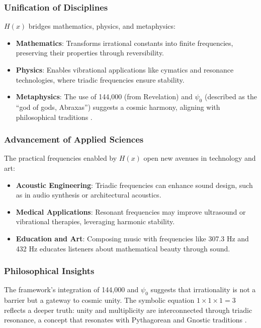 \subsubsection{Unification of Disciplines}
\( H(x) \) bridges mathematics, physics, and metaphysics:
\begin{itemize}
    \item \textbf{Mathematics}: Transforms irrational constants into finite frequencies, preserving their properties through reversibility.
    \item \textbf{Physics}: Enables vibrational applications like cymatics and resonance technologies, where triadic frequencies ensure stability.
    \item \textbf{Metaphysics}: The use of 144,000 (from Revelation) and \( \psi_0 \) (described as the “god of gods, Abraxas”) suggests a cosmic harmony, aligning with philosophical traditions \cite{revelation}.
\end{itemize}

\subsubsection{Advancement of Applied Sciences}
The practical frequencies enabled by \( H(x) \) open new avenues in technology and art:
\begin{itemize}
    \item \textbf{Acoustic Engineering}: Triadic frequencies can enhance sound design, such as in audio synthesis or architectural acoustics.
    \item \textbf{Medical Applications}: Resonant frequencies may improve ultrasound or vibrational therapies, leveraging harmonic stability.
    \item \textbf{Education and Art}: Composing music with frequencies like 307.3 Hz and 432 Hz educates listeners about mathematical beauty through sound.
\end{itemize}

\subsubsection{Philosophical Insights}
The framework’s integration of 144,000 and \( \psi_0 \) suggests that irrationality is not a barrier but a gateway to cosmic unity. The symbolic equation \( 1 \times 1 \times 1 = 3 \) reflects a deeper truth: unity and multiplicity are interconnected through triadic resonance, a concept that resonates with Pythagorean and Gnostic traditions \cite{revelation}.

